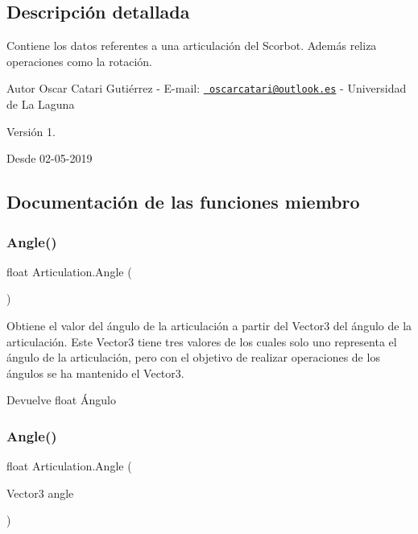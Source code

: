 \subsection{Descripción detallada}
Contiene los datos referentes a una articulación del Scorbot. Además reliza operaciones como la rotación. \begin{DoxyAuthor}{Autor}
Oscar Catari Gutiérrez -\/ E-\/mail\+: \href{mailto:oscarcatari@outlook.es}{\texttt{ oscarcatari@outlook.\+es}} -\/ Universidad de La Laguna 
\end{DoxyAuthor}
\begin{DoxyVersion}{Versión}
1. 
\end{DoxyVersion}
\begin{DoxySince}{Desde}
02-\/05-\/2019 
\end{DoxySince}


\subsection{Documentación de las funciones miembro}
\mbox{\label{class_articulation_a530b3282ef1e062b8a752eddb0f624f8}} 
\subsubsection{\texorpdfstring{Angle()}{Angle()}\hspace{0.1cm}{\footnotesize\ttfamily [1/2]}}
{\footnotesize\ttfamily float Articulation.\+Angle (\begin{DoxyParamCaption}{ }\end{DoxyParamCaption})\hspace{0.3cm}{\ttfamily [inline]}}

Obtiene el valor del ángulo de la articulación a partir del Vector3 del ángulo de la articulación. Este Vector3 tiene tres valores de los cuales solo uno representa el ángulo de la articulación, pero con el objetivo de realizar operaciones de los ángulos se ha mantenido el Vector3. \begin{DoxyReturn}{Devuelve}
float Ángulo 
\end{DoxyReturn}
\mbox{\label{class_articulation_a778011e0e6155ccf305808d24cbbda64}} 
\subsubsection{\texorpdfstring{Angle()}{Angle()}\hspace{0.1cm}{\footnotesize\ttfamily [2/2]}}
{\footnotesize\ttfamily float Articulation.\+Angle (\begin{DoxyParamCaption}\item[{Vector3}]{angle }\end{DoxyParamCaption})\hspace{0.3cm}{\ttfamily [inline]}}

